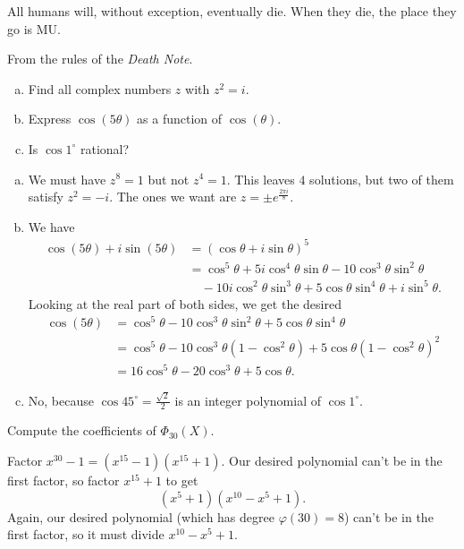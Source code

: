 \documentclass[11pt]{scrartcl}
\providecommand{\dg}{^\circ}
\providecommand{\ii}{\item}
\begin{document}
\epigraph{All humans will, without exception, eventually die.
When they die, the place they go is MU.}
{From the rules of the \emph{Death Note}.}
\begin{problem}
[2$\clubsuit$]  \begin{enumerate}[(a)]
    \ii Find all complex numbers $z$ with $z^2=i$.
    \ii Express $\cos(5\theta)$ as a function of $\cos(\theta)$.
    \ii Is $\cos1\dg$ rational?
  \end{enumerate}
\end{problem} 
\begin{enumerate}[(a)]
    \ii We must have $z^8 = 1$ but not $z^4 = 1$.
    This leaves $4$ solutions, but two of them satisfy $z^2 = -i$.
    The ones we want are $z = \pm e^{\frac{2\pi i}{8}}$.
    \ii We have
    \begin{align*}
        \cos(5\theta) + i \sin(5\theta) &= (\cos \theta + i \sin \theta)^5 \\
        &= \cos ^5 \theta + 5i \cos ^4 \theta \sin \theta - 10 \cos ^3 \theta \sin ^2 \theta \\
        &\quad - 10i \cos ^2 \theta \sin ^3 \theta + 5 \cos \theta \sin ^4 \theta + i\sin ^5 \theta.
    \end{align*}
    Looking at the real part of both sides, we get the desired
    \begin{align*}
        \cos(5\theta) &= \cos^5 \theta - 10 \cos^3 \theta \sin^2 \theta + 5 \cos \theta \sin^4 \theta \\
        &= \cos ^5 \theta - 10 \cos ^3 \theta (1 - \cos^2 \theta) + 5 \cos \theta (1 - \cos^2 \theta)^2 \\
        &= 16 \cos ^5 \theta - 20 \cos ^3 \theta + 5 \cos \theta.
    \end{align*}
    \ii No, because $\cos45\dg = \frac{\sqrt2}2$ is an integer polynomial of $\cos1\dg$.
\end{enumerate}

\begin{problem}
[2$\clubsuit$]  Compute the coefficients of $\Phi_{30}(X)$.
\end{problem} 
Factor $x^{30} - 1 = (x^{15} - 1)(x^{15} + 1)$.
Our desired polynomial can't be in the first factor, so factor $x^{15} + 1$ to get
\[ (x^5 + 1)(x^{10} - x^5 + 1). \]
Again, our desired polynomial (which has degree $\varphi(30) = 8$) can't be in the first factor,
so it must divide $x^{10} - x^5 + 1$.
\end{document}
